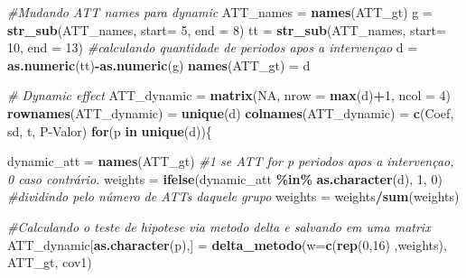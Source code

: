 \documentclass[portugues]{article}
\newenvironment{Shaded}{\begin{snugshade}}{\end{snugshade}}
\newcommand{\AttributeTok}[1]{\textcolor[rgb]{0.13,0.29,0.53}{#1}}
\newcommand{\CommentTok}[1]{\textcolor[rgb]{0.56,0.35,0.01}{\textit{#1}}}
\newcommand{\ConstantTok}[1]{\textcolor[rgb]{0.56,0.35,0.01}{#1}}
\newcommand{\ControlFlowTok}[1]{\textcolor[rgb]{0.13,0.29,0.53}{\textbf{#1}}}
\newcommand{\DecValTok}[1]{\textcolor[rgb]{0.00,0.00,0.81}{#1}}
\newcommand{\FunctionTok}[1]{\textcolor[rgb]{0.13,0.29,0.53}{\textbf{#1}}}
\newcommand{\NormalTok}[1]{#1}
\newcommand{\OtherTok}[1]{\textcolor[rgb]{0.56,0.35,0.01}{#1}}
\newcommand{\SpecialCharTok}[1]{\textcolor[rgb]{0.81,0.36,0.00}{\textbf{#1}}}
\newcommand{\StringTok}[1]{\textcolor[rgb]{0.31,0.60,0.02}{#1}}
\begin{document}
\begin{box_code}

\begin{Shaded}
\begin{Highlighting}[]
\CommentTok{\#Mudando ATT names para \textquotesingle{}dynamic\textquotesingle{}}
\NormalTok{ATT\_names }\OtherTok{=} \FunctionTok{names}\NormalTok{(ATT\_gt)}
\NormalTok{g }\OtherTok{=} \FunctionTok{str\_sub}\NormalTok{(ATT\_names,  }\AttributeTok{start=} \DecValTok{5}\NormalTok{, }\AttributeTok{end =}  \DecValTok{8}\NormalTok{)}
\NormalTok{tt }\OtherTok{=} \FunctionTok{str\_sub}\NormalTok{(ATT\_names,  }\AttributeTok{start=} \DecValTok{10}\NormalTok{, }\AttributeTok{end =}  \DecValTok{13}\NormalTok{)}
\CommentTok{\#calculando quantidade de periodos apos a intervençao}
\NormalTok{d }\OtherTok{=} \FunctionTok{as.numeric}\NormalTok{(tt)}\SpecialCharTok{{-}}\FunctionTok{as.numeric}\NormalTok{(g)}
\FunctionTok{names}\NormalTok{(ATT\_gt) }\OtherTok{=}\NormalTok{ d}

\CommentTok{\# Dynamic effect}
\NormalTok{ATT\_dynamic }\OtherTok{=} \FunctionTok{matrix}\NormalTok{(}\ConstantTok{NA}\NormalTok{, }\AttributeTok{nrow =} \FunctionTok{max}\NormalTok{(d)}\SpecialCharTok{+}\DecValTok{1}\NormalTok{, }\AttributeTok{ncol =} \DecValTok{4}\NormalTok{)}
\FunctionTok{rownames}\NormalTok{(ATT\_dynamic) }\OtherTok{=} \FunctionTok{unique}\NormalTok{(d)}
\FunctionTok{colnames}\NormalTok{(ATT\_dynamic) }\OtherTok{=} \FunctionTok{c}\NormalTok{(}\StringTok{\textquotesingle{}Coef\textquotesingle{}}\NormalTok{, }\StringTok{\textquotesingle{}sd\textquotesingle{}}\NormalTok{, }\StringTok{\textquotesingle{}t\textquotesingle{}}\NormalTok{, }\StringTok{\textquotesingle{}P{-}Valor\textquotesingle{}}\NormalTok{)}
\ControlFlowTok{for}\NormalTok{(p }\ControlFlowTok{in} \FunctionTok{unique}\NormalTok{(d))\{}
  
\NormalTok{dynamic\_att }\OtherTok{=} \FunctionTok{names}\NormalTok{(ATT\_gt)}
\CommentTok{\#1 se ATT for p periodos apos a intervençao, 0 caso contrário.}
\NormalTok{weights }\OtherTok{=} \FunctionTok{ifelse}\NormalTok{(dynamic\_att }\SpecialCharTok{\%in\%} \FunctionTok{as.character}\NormalTok{(d), }\DecValTok{1}\NormalTok{, }\DecValTok{0}\NormalTok{)}
\CommentTok{\#dividindo pelo número de ATTs daquele grupo}
\NormalTok{weights }\OtherTok{=}\NormalTok{ weights}\SpecialCharTok{/}\FunctionTok{sum}\NormalTok{(weights)}
  
\CommentTok{\#Calculando o teste de hipotese via metodo delta e salvando}
\CommentTok{em uma matrix}
\NormalTok{ATT\_dynamic[}\FunctionTok{as.character}\NormalTok{(p),] }\OtherTok{=} \FunctionTok{delta\_metodo}\NormalTok{(}\AttributeTok{w=}\FunctionTok{c}\NormalTok{(}\FunctionTok{rep}\NormalTok{(}\DecValTok{0}\NormalTok{,}\DecValTok{16}\NormalTok{)}
\hspace{10mm} \NormalTok{,weights), ATT\_gt, cov1)}
  

\end{Highlighting}
\end{Shaded}
\end{box_code}
\end{document}
